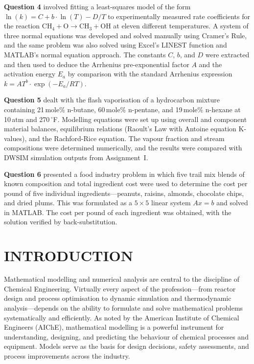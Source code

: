 \documentclass[12pt,a4paper]{article}
\begin{document}
\textbf{Question 4} involved fitting a least-squares model of the form
$\ln(k) = C + b\cdot\ln(T) - D/T$ to experimentally measured rate coefficients for the
reaction $\text{CH}_4 + \text{O} \rightarrow \text{CH}_3 + \text{OH}$ at eleven different
temperatures. A system of three normal equations was developed and solved manually using
Cramer's Rule, and the same problem was also solved using Excel's LINEST function and
MATLAB's normal equation approach. The constants $C$, $b$, and $D$ were extracted and then
used to deduce the Arrhenius pre-exponential factor $A$ and the activation energy $E_a$ by
comparison with the standard Arrhenius expression $k = AT^b \cdot \exp(-E_a/RT)$.

\textbf{Question 5} dealt with the flash vaporisation of a hydrocarbon mixture containing
21\,mole\% n-butane, 60\,mole\% n-pentane, and 19\,mole\% n-hexane at 10\,atm and
270\,$^{\circ}$F. Modelling equations were set up using overall and component material
balances, equilibrium relations (Raoult's Law with Antoine equation K-values), and the
Rachford-Rice equation. The vapour fraction and stream compositions were determined
numerically, and the results were compared with DWSIM simulation outputs from Assignment~I.

\textbf{Question 6} presented a food industry problem in which five trail mix blends of known
composition and total ingredient cost were used to determine the cost per pound of five
individual ingredients---peanuts, raisins, almonds, chocolate chips, and dried plums. This was
formulated as a $5\times5$ linear system $Ax = b$ and solved in MATLAB. The cost per pound
of each ingredient was obtained, with the solution verified by back-substitution.

\newpage
\tableofcontents
\newpage

\section*{INTRODUCTION}

Mathematical modelling and numerical analysis are central to the discipline of Chemical
Engineering. Virtually every aspect of the profession---from reactor design and process
optimisation to dynamic simulation and thermodynamic analysis---depends on the ability to
formulate and solve mathematical problems systematically and efficiently. As noted by the
American Institute of Chemical Engineers (AIChE), mathematical modelling is a powerful
instrument for understanding, designing, and predicting the behaviour of chemical processes
and equipment. Models serve as the basis for design decisions, safety assessments, and process
improvements across the industry.
\end{document}

